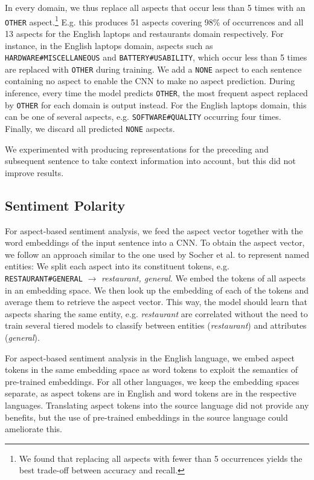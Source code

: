 \documentclass[11pt,letterpaper]{article}
\begin{document}
In every domain, we thus replace all aspects that occur less than 5 times with an \texttt{OTHER} aspect.\footnote{We found that replacing all aspects with fewer than 5 occurrences yields the best trade-off between accuracy and recall.} E.g. this produces 51 aspects covering 98\% of occurrences and all 13 aspects for the English laptops and restaurants domain respectively. 
For instance, in the English laptops domain, aspects such as \texttt{HARDWARE\#MISCELLANEOUS} and  \texttt{BATTERY\#USABILITY}, which occur less than 5 times are replaced with \texttt{OTHER} during training. We add a \texttt{NONE} aspect to each sentence containing no aspect to enable the CNN to make no aspect prediction. During inference, every time the model predicts \texttt{OTHER}, the most frequent aspect replaced by \texttt{OTHER} for each domain is output instead. For the English laptops domain, this can be one of several aspects, e.g. \texttt{SOFTWARE\#QUALITY} occurring four times. Finally, we discard all predicted \texttt{NONE} aspects.

We experimented with producing representations for the preceding and subsequent sentence to take context information into account, but this did not improve results.

\subsection{Sentiment Polarity}

For aspect-based sentiment analysis, we feed the aspect vector together with the word embeddings of the input sentence into a CNN. To obtain the aspect vector, we follow an approach similar to the one used by Socher et al.  to represent named entities: We split each aspect into its constituent tokens, e.g. \texttt{RESTAURANT\#GENERAL} $\rightarrow$ \emph{restaurant, general}. We embed the tokens of all aspects in an embedding space. We then look up the embedding of each of the tokens and average them to retrieve the aspect vector. This way, the model should learn that aspects sharing the same entity, e.g. \emph{restaurant} are correlated without the need to train several tiered models to classify between entities (\emph{restaurant}) and attributes (\emph{general}). 

For aspect-based sentiment analysis in the English language, we embed aspect tokens in the same embedding space as word tokens to exploit the semantics of pre-trained embeddings. For all other languages, we keep the embedding spaces separate, as aspect tokens are in English and word tokens are in the respective languages. Translating aspect tokens into the source language did not provide any benefits, but the use of pre-trained embeddings in the source language could ameliorate this.
\end{document}
